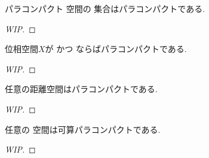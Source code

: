 \documentclass[uplatex, dvipdfmx, a4paper, 12pt, class=jsbook, crop=false]{standalone}
\begin{document}
\begin{proposition}
	パラコンパクト \Hausdorff 空間の \Fsigma 集合はパラコンパクトである.
\end{proposition}
\begin{proof}
	[WIP]
\end{proof}

\begin{theorem}
	位相空間$ X $が  かつ \Lindelof ならばパラコンパクトである.
\end{theorem}
\begin{proof}
	[WIP]
\end{proof}

\begin{theorem}[A. H. Stone]
	任意の距離空間はパラコンパクトである.
\end{theorem}
\begin{proof}
	[WIP]
\end{proof}

\begin{proposition}
	任意の  空間は可算パラコンパクトである.
\end{proposition}
\begin{proof}
	[WIP]
\end{proof}
\end{document}
